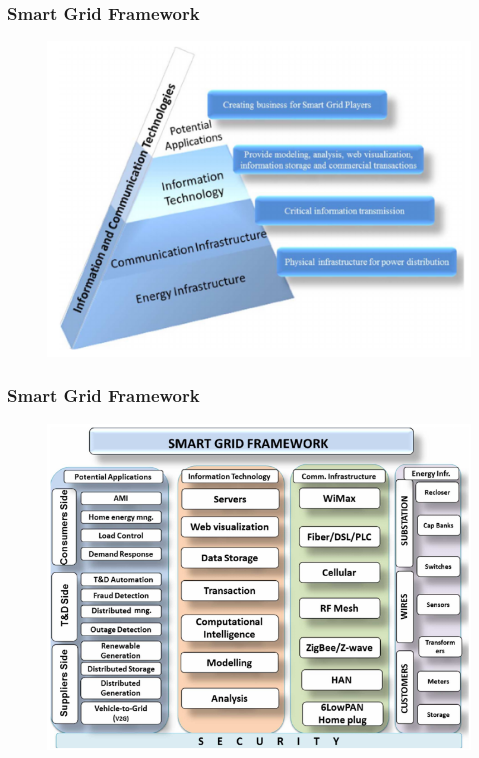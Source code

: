
\begin{frame}[fragile]
  \frametitle{Smart Grid Framework}
	\begin{figure}[h] 
		\includegraphics[scale=0.6]{imgs/ict.png}
	\end{figure}
\end{frame}

\begin{frame}[fragile]
  \frametitle{Smart Grid Framework}
	\begin{figure}[h] 
		\includegraphics[scale=0.6]{imgs/sgframework.png}
	\end{figure}
\end{frame}

